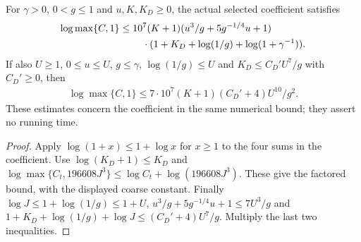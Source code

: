 \begin{lemma}
    \label{lem:interleaved_output_coefficient_gap_bound}
    \leanok
    For $\gamma>0$, $0<g\le1$ and $u,K,K_D\ge0$, the actual selected
    coefficient satisfies
    \begin{align}
        \log\max\{C,1\}\le{} & 10^7(K+1)(u^3/g+5g^{-1/4}u+1)\notag              \\
                             & \quad\cdot(1+K_D+\log(1/g)+\log(1+\gamma^{-1})).
        \label{eq:interleaved_output_factored_log_coefficient}
    \end{align}
    If also $U\ge1$, $0\le u\le U$, $g\le\gamma$,
    $\log(1/g)\le U$ and $K_D\le C_D' U^7/g$ with $C_D'\ge0$, then
    \begin{align}
        \log\max\{C,1\}\le 7\cdot10^7(K+1)(C_D'+4)U^{10}/g^2.
        \label{eq:interleaved_output_log_coefficient_gap_bound}
    \end{align}
    These estimates concern the coefficient in the same numerical bound;
    they assert no running time.
\end{lemma}
\begin{proof}\leanok
    Apply $\log(1+x)\le1+\log x$ for $x\ge1$ to the four sums in the
    coefficient. Use $\log(K_D+1)\le K_D$ and
    $\log\max\{C_t,196608J^3\}\le\log C_t+\log(196608J^3)$.
    These give the factored bound, with the displayed coarse constant.
    Finally $\log J\le1+\log(1/g)\le1+U$,
    $u^3/g+5g^{-1/4}u+1\le7U^3/g$ and
    $1+K_D+\log(1/g)+\log J\le(C_D'+4)U^7/g$.
    Multiply the last two inequalities.
\end{proof}
